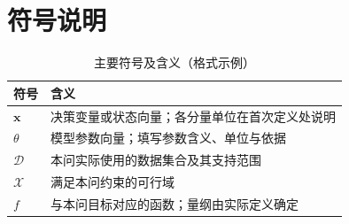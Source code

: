 \section{符号说明}
\renewcommand{\thetable}{\arabic{table}}
\begin{table}[htbp]
\centering
\caption{主要符号及含义（格式示例）}\label{tab:symbols}
\fontsize{9.5}{12}\selectfont
\setlength{\tabcolsep}{4pt}
\begin{tabularx}{\textwidth}{p{39mm}X}
\toprule
符号 & 含义 \\
\midrule
$\mathbf{x}$ & 决策变量或状态向量；各分量单位在首次定义处说明 \\
$\theta$ & 模型参数向量；填写参数含义、单位与依据 \\
$\mathcal{D}$ & 本问实际使用的数据集合及其支持范围 \\
$\mathcal{X}$ & 满足本问约束的可行域 \\
$f$ & 与本问目标对应的函数；量纲由实际定义确定 \\
\bottomrule
\end{tabularx}
\end{table}
\FloatBarrier
\renewcommand{\thetable}{1-\arabic{table}}
\setcounter{table}{0}

